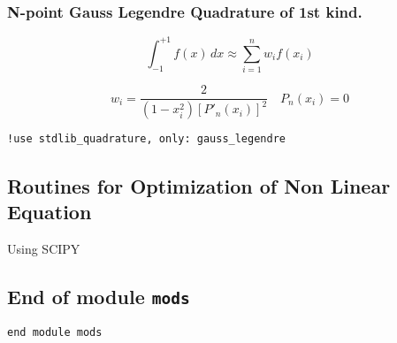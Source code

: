 \documentclass[a4paper,11pt,twoside]{article}
\begin{document}
\subsubsection{N-point Gauss Legendre Quadrature of 1st kind.}
\label{sec:org62b5f27}

$$
\int _{-1}^{+1}{f(x)}\,dx\approx \sum _{i=1}^{n}w_{i}f(x_{i})
$$

$$
w_{i}=\frac {2}{\left(1-x_{i}^{2}\right)\left[P'_{n}(x_{i})\right]^{2}} \quad   P_n(x_i)=0
$$

\begin{verbatim}
!use stdlib_quadrature, only: gauss_legendre
\end{verbatim}

\subsection{Routines for Optimization of Non Linear Equation}
\label{sec:org58523f3}
Using SCIPY
\subsection{End of module \texttt{mods}}
\label{sec:org48b10e5}

\begin{verbatim}
end module mods
\end{verbatim}


\clearpage
\end{document}
